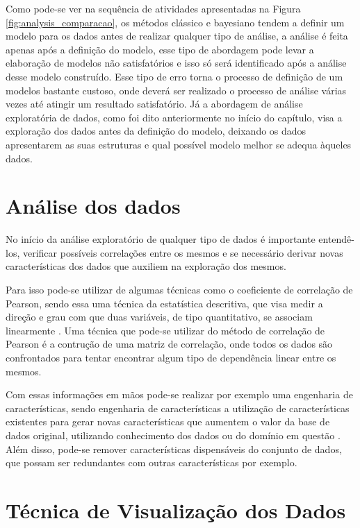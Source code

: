 Como pode-se ver na sequência de atividades apresentadas na Figura
\ref{fig:analysis_comparacao}, os métodos clássico e bayesiano tendem a definir
um modelo para os dados antes de realizar qualquer tipo de análise, a análise é
feita apenas após a definição do modelo, esse tipo de abordagem pode levar a
elaboração de modelos não satisfatórios e isso só será identificado após a
análise desse modelo construído. Esse tipo de erro torna o processo de definição
de um modelos bastante custoso, onde deverá ser realizado o processo de análise
várias vezes até atingir um resultado satisfatório. Já a abordagem de análise
exploratória de dados, como foi dito anteriormente no início do capítulo, visa a
exploração dos dados antes da definição do modelo, deixando os dados
apresentarem as suas estruturas e qual possível modelo melhor se adequa àqueles
dados.

\section{Análise dos dados}

No início da análise exploratório de qualquer tipo de dados é importante
entendê-los, verificar possíveis correlações entre os mesmos e se necessário
derivar novas características dos dados que auxiliem na exploração dos mesmos.

Para isso pode-se utilizar de algumas técnicas como o coeficiente de correlação
de Pearson, sendo essa uma técnica da estatística descritiva, que visa medir a
direção e grau com que duas variáveis, de tipo quantitativo, se associam
linearmente \cite{rossman:1996}. Uma técnica que pode-se utilizar do método de
correlação de Pearson é a contrução de uma matriz de correlação, onde todos os
dados são confrontados para tentar encontrar algum tipo de dependência linear
entre os mesmos. 

Com essas informações em mãos pode-se realizar por exemplo uma engenharia de
características, sendo engenharia de características a utilização de
características existentes para gerar novas características que aumentem o valor
da base de dados original, utilizando conhecimento dos dados ou do domínio em
questão \cite{brink:2014}. Além disso, pode-se remover características
dispensáveis do conjunto de dados, que possam ser redundantes com outras
características por exemplo.

\section{Técnica de Visualização dos Dados}\label{4-plot}

